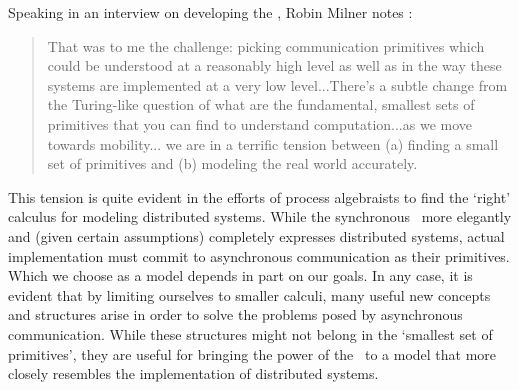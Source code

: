 Speaking in an interview on developing the \picalc, Robin Milner notes \cite{miln03}:
\begin{quote}
That was to me the challenge: picking communication primitives which could be understood at a reasonably high level as well as in the way these systems are implemented at a very low level...There's a subtle change from the Turing-like question of what are the fundamental, smallest sets of primitives that you can find to understand computation...as we move towards mobility... we are in a terrific tension between (a) finding a small set of primitives and (b) modeling the real world accurately.
\end{quote}
This tension is quite evident in the efforts of process algebraists to find the `right' calculus for modeling distributed systems.  
While the synchronous \picalc\ more elegantly and (given certain assumptions) completely expresses distributed systems, actual implementation must commit to asynchronous communication as their primitives.  
Which we choose as a model depends in part on our goals.  
In any case, it is evident that by limiting ourselves to smaller calculi, many useful new concepts and structures arise in order to solve the problems posed by asynchronous communication.  
While these structures might not belong in the `smallest set of primitives', they are useful for bringing the power of the \picalc\ to a model that more closely resembles the implementation of distributed systems.